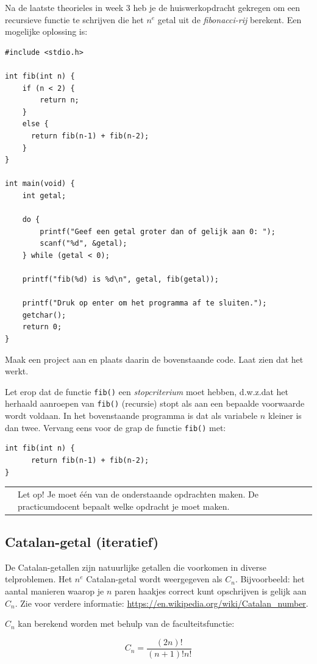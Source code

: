 \documentclass[a4paper,10pt,fleqn,twoside]{article}
\newcommand{\letop}{%
\vspace*{2ex}
\begin{mdframed}[outerlinewidth = 1 ,%
roundcorner = 4 pt,%
leftmargin = 40,%
rightmargin = 40,%
backgroundcolor = yellow!40,%
outerlinecolor = red!70!black,%
innertopmargin = \topskip,%
splittopskip = \topskip,%
]
\begin{tabularx}{\linewidth}{m{1cm}X}
\Large\leftpointright & Let op! Je moet één van de onderstaande opdrachten maken. De practicumdocent bepaalt welke opdracht je moet maken.
\end{tabularx}
\end{mdframed}
}
\begin{document}
Na de laatste theorieles in week 3 heb je de huiswerkopdracht gekregen om een recursieve functie te schrijven die het $n^e$ getal uit de \textsl{fibonacci-rij} berekent. Een mogelijke oplossing is:

\begin{lstlisting}
#include <stdio.h>

int fib(int n) {
    if (n < 2) {
        return n;
	}
	else {
	  return fib(n-1) + fib(n-2);
	}
} 

int main(void) {
    int getal;

    do {
        printf("Geef een getal groter dan of gelijk aan 0: ");
        scanf("%d", &getal);
    } while (getal < 0);

    printf("fib(%d) is %d\n", getal, fib(getal));

    printf("Druk op enter om het programma af te sluiten.");
    getchar();
    return 0;
}
\end{lstlisting}

Maak een project aan en plaats daarin de bovenstaande code. Laat zien dat het werkt.

Let erop dat de functie \lstinline|fib()| een \textsl{stopcriterium} moet hebben, d.w.z.\@ dat het herhaald aanroepen van \lstinline|fib()| (recursie) stopt als aan een bepaalde voorwaarde wordt voldaan. In het bovenstaande programma is dat als variabele $n$ kleiner is dan twee. Vervang eens voor de grap de functie \lstinline|fib()| met:

\begin{lstlisting}
int fib(int n) {
      return fib(n-1) + fib(n-2);
} 
\end{lstlisting}



\letop

\subsection{Catalan-getal (iteratief)}
De Catalan-getallen zijn natuurlijke getallen die voorkomen in diverse telproblemen. Het $n^e$ Catalan-getal wordt weergegeven als $C_n$. Bijvoorbeeld: het aantal manieren waarop je $n$ paren haakjes correct kunt opschrijven is gelijk aan $C_n$. Zie voor verdere informatie: \url{https://en.wikipedia.org/wiki/Catalan_number}.

$C_n$ kan berekend worden met behulp van de faculteitsfunctie: 

\begin{equation*}
C_n = \dfrac{(2n)!}{(n+1)!n!}
\end{equation*}
\end{document}
